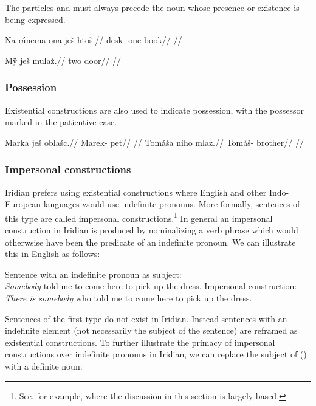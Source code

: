 The particles  and  must always precede the noun whose presence or existence is being expressed.

\pex
\begingl
\gla Na ránema ona ješ htoš.//
\glb \Loc{} desk- one \Exst{} book//
\glft {}//
\endgl
\xe

\pex
\begingl
\gla M\"y ješ mulaž.//
\glb two \Exst{} door//
\glft {}//
\endgl
\xe



\subsubsection{Possession}
Existential constructions are also used to indicate possession, with the possessor marked in the patientive case.

\begin{multicols}{2}
\pex
  \begingl
    \gla Marka ješ oblašc.//
    \glb Marek-\Acc{} \Exst{} pet//
    \glft {}//
  \endgl
\xe
\pex
  \begingl
    \gla Tomáša niho mlaz.//
    \glb Tomáš-\Acc{} \N{}\Exst{} brother//
    \glft {}//
  \endgl
\xe
\end{multicols}

\subsubsection{Impersonal constructions}

Iridian prefers using existential constructions where English and other Indo-European languages would use indefinite pronouns. More formally, sentences of this type are called impersonal constructions.\footnote{See, for example, \textcite{lawtagalog} where the discussion in this section is largely based.} In general an impersonal construction in Iridian is produced by nominalizing a verb phrase which would otherwsise have been the predicate of an indefinite pronoun. We can illustrate this in English as follows:

\pex
\a  {}Sentence with an indefinite pronoun as subject:\\
    \emph{Somebody} told me to come here to pick up the dress.
\a  Impersonal construction:\\
    \emph{There is somebody} who told me to come here to pick up the dress.
\xe

Sentences of the first type do not exist in Iridian. Instead sentences with an indefinite element (not necessarily the subject of the sentence) are reframed as existential constructions. To further illustrate the primacy of impersonal constructions over indefinite pronouns in Iridian, we can replace the subject of () with a definite noun:

